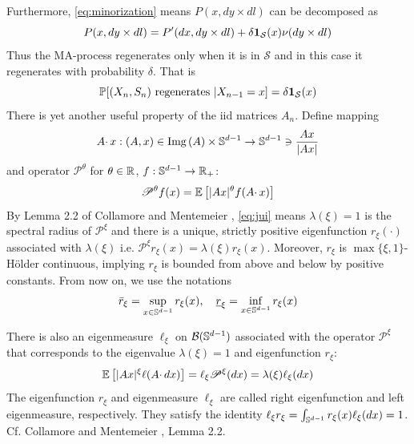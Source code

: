 Furthermore, \eqref{eq:minorization} means
$P(x, dy \times dl)$ can be decomposed as
\[
P(x, dy \times dl) = P'(dx, dy \times dl)
+
\delta \mathbf{1}_{\mathcal S}(x) \nu(dy \times dl)
\]
Thus the MA-process regenerates only when it is in $\mathcal S$ and in
this case it regenerates with probability $\delta$. That is
\[
\mathbb{P}[(X_n, S_n) \text{ regenerates } | X_{n-1} = x] = \delta \mathbf{1}_{\mathcal S}(x)
\]
There is yet another useful property of the iid matrices $A_n$. Define
mapping
\[
A \cdotp x: (A, x) \in \text{Img}\,(A) \times \mathbb S^{d-1} \to
\mathbb S^{d-1} \ni {
  A x \over |A x|
}
\]
and operator $\mathscr P^\theta$ for $\theta \in \mathbb R$,
$f: \mathbb S^{d-1} \to \mathbb R_+$:
\[
\mathscr P^\theta f(x) =
\mathbb{E} \left[
  |A x|^\theta f(A \cdotp x)
\right]
\]
By Lemma 2.2 of Collamore and Mentemeier
\cite{collamore:mentemeier:2016}, \eqref{eq:jui} means
$\lambda(\xi) = 1$ is the spectral radius of $\mathscr P^\xi$ and
there is a unique, strictly positive eigenfunction $r_\xi(\cdot)$
associated with $\lambda(\xi)$ i.e.
$\mathscr P^\xi r_\xi(x) = \lambda(\xi) r_\xi(x)$.
Moreover, $r_\xi$ is $\max\{\xi, 1\}$-H\"older continuous, implying
$r_\xi$ is bounded from above and below by positive constants. From
now on, we use the notations
\[
\bar r_\xi = \sup_{x \in \mathbb S^{d-1}} r_\xi(x),\quad
\underline r_\xi = \inf_{x \in \mathbb S^{d-1}} r_\xi(x)
\]

There is also an eigenmeasure $\ell_\xi$ on $\mathcal B(\mathbb S^{d-1})$
associated with the operator $\mathscr P^\xi$ that corresponds to the
eigenvalue $\lambda(\xi) = 1$ and eigenfunction $r_\xi$:
\begin{equation}
  \label{eq:eigenmeasure}
  \mathbb{E} \left[ |A x|^\xi \ell(A \cdotp dx) \right]
  = \ell_\xi \mathscr P^\xi (dx)
  = \lambda(\xi) \ell_\xi(dx)
\end{equation}
The eigenfunction $r_\xi$ and eigenmeasure $\ell_\xi$ are called
right eigenfunction and left eigenmeasure, respectively. They
satisfy the identity
$\ell_\xi r_\xi = \int_{\mathbb S^{d-1}} r_\xi(x) \ell_\xi(dx) = 1$.
Cf. Collamore and Mentemeier \cite{collamore:mentemeier:2016},
Lemma 2.2.

